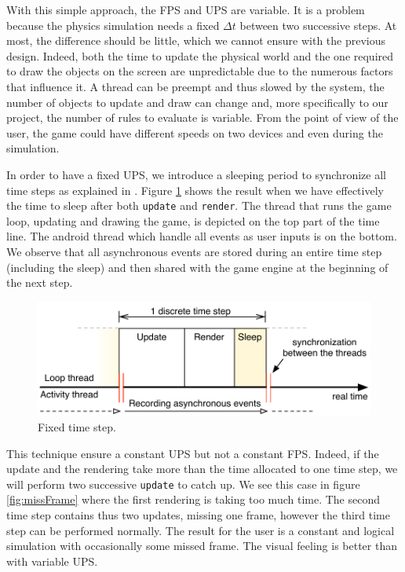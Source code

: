 \documentclass[11pt,a4paper]{article}
\begin{document}
With this simple approach, the FPS and UPS are variable. It is a problem because the physics simulation needs a fixed $\Delta t$ between two successive steps. At most, the difference should be little, which we cannot ensure with the previous design. Indeed, both the time to update the physical world and the one required to draw the objects on the screen are unpredictable due to the numerous factors that influence it. A thread can be preempt and thus slowed by the system, the number of objects to update and draw can change and, more specifically to our project, the number of rules to evaluate is variable. From the point of view of the user, the game could have different speeds on two devices and even during the simulation.

In order to have a fixed UPS, we introduce a sleeping period to synchronize all time steps as explained in \cite{FixYourTimestep, AndroidGameLoop}. Figure \ref{fig:fixedTimeStep} shows the result when we have effectively the time to sleep after both \texttt{update} and \texttt{render}. The thread that runs the game loop, updating and drawing the game, is depicted on the top part of the time line. The android thread which handle all events as user inputs is on the bottom. We observe that all asynchronous events are stored during an entire time step (including the sleep) and then shared with the game engine at the beginning of the next step.

\begin{figure}[h]
\centering
\includegraphics[scale = 0.8]{images/fixedTimeStep} 
\caption{Fixed time step.}
\label{fig:fixedTimeStep}
\end{figure}

This technique ensure a constant UPS but not a constant FPS. Indeed, if the update and the rendering take more than the time allocated to one time step, we will perform two successive \texttt{update} to catch up. We see this case in figure \ref{fig:missFrame} where the first rendering is taking too much time. The second time step contains thus two updates, missing one frame, however the third time step can be performed normally. The result for the user is a constant and logical simulation with occasionally some missed frame. The visual feeling is better than with variable UPS.
\end{document}
